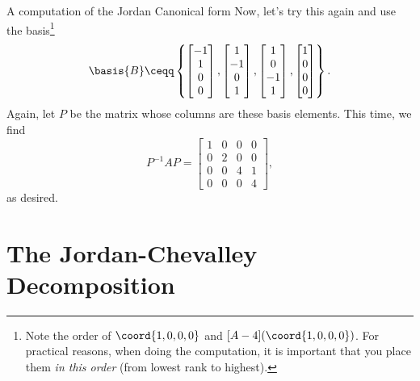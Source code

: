 \begin{exm}{A computation of the Jordan Canonical form}{}
	Now, let's try this again and use the basis\footnote{Note the order of $\coord{1,0,0,0}$ and $[A-4](\coord{1,0,0,0})$.  For practical reasons, when doing the computation, it is important that you place them \emph{in this order} (from lowest rank to highest).}
	\begin{equation}
		\basis{B}\ceqq \left\{ \begin{bmatrix}-1 \\ 1 \\ 0 \\ 0\end{bmatrix},\begin{bmatrix}1 \\ -1 \\ 0 \\ 1\end{bmatrix},\begin{bmatrix}1 \\ 0 \\ -1 \\ 1\end{bmatrix},\begin{bmatrix}1 \\ 0 \\ 0 \\ 0\end{bmatrix}\right\} .
	\end{equation}
	Again, let $P$ be the matrix whose columns are these basis elements.  This time, we find
	\begin{equation}
		P^{-1}AP=\begin{bmatrix}1 & 0 & 0 & 0 \\ 0 & 2 & 0 & 0 \\ 0 & 0 & 4 & 1 \\ 0 & 0 & 0 & 4\end{bmatrix},
	\end{equation}
	as desired.
\end{exm}

\section{The Jordan-Chevalley Decomposition}

